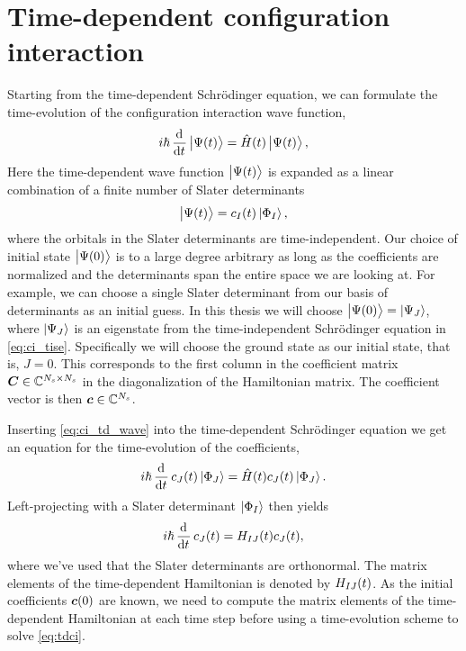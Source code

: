     \section{Time-dependent configuration interaction}
        Starting from the time-dependent Schrödinger equation, we can formulate
        the time-evolution of the configuration interaction wave function,
        \begin{align}
            i\hslash \dod[]{}{t}\ket{\Psi(t)}
            = \hamil(t)\ket{\Psi(t)},
            \label{eq:ci_tdse}
        \end{align}
        Here the time-dependent wave function $\ket{\Psi(t)}$ is expanded as a
        linear combination of a finite number of Slater determinants
        \begin{align}
            \ket{\Psi(t)} = c_{I}(t) \ket{\Phi_I},
            \label{eq:ci_td_wave}
        \end{align}
        where the orbitals in the Slater determinants are time-independent.
        Our choice of initial state $\ket{\Psi(0)}$ is to a large degree
        arbitrary as long as the coefficients are normalized and the
        determinants span the entire space we are looking at.
        For example, we can choose a single Slater determinant from our basis of
        determinants as an initial guess.
        In this thesis we will choose $\ket{\Psi(0)} = \ket{\Psi_J}$, where
        $\ket{\Psi_J}$ is an eigenstate from the time-independent Schrödinger
        equation in \autoref{eq:ci_tise}.
        Specifically we will choose the ground state as our initial state, that
        is, $J = 0$.
        This corresponds to the first column in the coefficient matrix
        $\boldsymbol{C} \in \mathbb{C}^{N_s \times N_s}$ in the diagonalization of the
        Hamiltonian matrix.
        The coefficient vector is then $\boldsymbol{c} \in \mathbb{C}^{N_s}$.

        Inserting \autoref{eq:ci_td_wave} into the time-dependent Schrödinger
        equation we get an equation for the time-evolution of the coefficients,
        \begin{align}
            i\hslash \dod[]{}{t}c_{J}(t)\ket{\slat_J}
            = \hamil(t) c_{J}(t)\ket{\slat_J}.
        \end{align}
        Left-projecting with a Slater determinant $\ket{\Phi_I}$ then yields
        \begin{gather}
            i\hslash \dod[]{}{t}c_{J}(t)
            = \hamilten_{IJ}(t) c_{J}(t),
            \label{eq:tdci}
        \end{gather}
        where we've used that the Slater determinants are orthonormal.
        The matrix elements of the time-dependent Hamiltonian is denoted by
        $H_{IJ}(t)$.
        As the initial coefficients $\boldsymbol{c}(0)$ are known, we need to compute
        the matrix elements of the time-dependent Hamiltonian at each time step
        before using a time-evolution scheme to solve \autoref{eq:tdci}.
